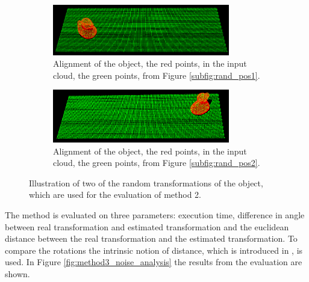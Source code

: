 \documentclass[../main.tex]{subfiles}
\begin{document}
\begin{figure}[H]
    \begin{subfigure}[t]{0.4\textwidth}
        \centering
        \captionsetup{width=.85\textwidth}
        \includegraphics[width=0.85\textwidth]{figures/simulated_depth_sensor/analysis_pcl_ex1.png}
        \caption{Alignment of the object, the red points, in the input cloud, the green points, from Figure \ref{subfig:rand_pos1}.}
        \label{subfig:align_pos1}
    \end{subfigure}
    \begin{subfigure}[t]{0.4\textwidth}
        \centering
        \captionsetup{width=0.85\textwidth}
        \includegraphics[width=0.85\textwidth]{figures/simulated_depth_sensor/analysis_pcl_ex2.png}
        \caption{Alignment of the object, the red points, in the input cloud, the green points, from Figure \ref{subfig:rand_pos2}.}
        \label{subfig:align_pos2}
    \end{subfigure}
    \caption{Illustration of two of the random transformations of the object, which are used for the evaluation of method 2.}
    \label{fig:random_positions}
\end{figure}
The method is evaluated on three parameters: execution time, difference in angle between real transformation and estimated transformation and the euclidean distance between the real transformation and the estimated transformation. To compare the rotations the intrinsic notion of distance, which is introduced in \cite{compare_rotations}, is used. In Figure \ref{fig:method3_noise_analysis} the results from the evaluation are shown. 
\end{document}
